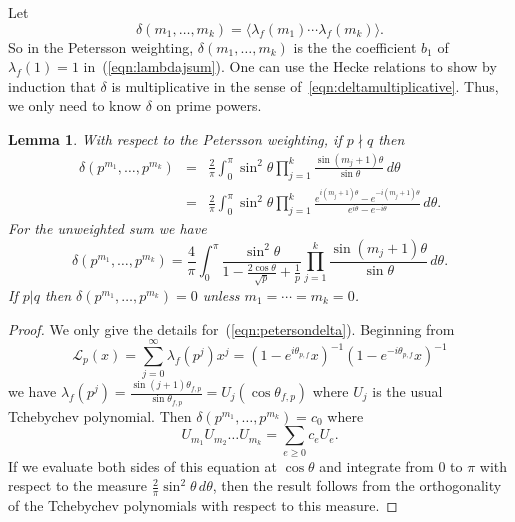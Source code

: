 \documentclass[12pt,letterpaper]{amsart}
\theoremstyle{plain}
\newtheorem{lemma}[theorem]{Lemma}
\theoremstyle{definition}
\theoremstyle{remark}
\numberwithin{equation}{subsection}
\numberwithin{theorem}{subsection}
\numberwithin{table}{subsection}
\begin{document}
Let
\begin{equation}\delta(m_1,\dots,m_k) = 
\langle \lambda_f(m_1)\cdots \lambda_f(m_k) \rangle.
\end{equation} 
So in the Petersson weighting, $\delta(m_1,\dots,m_k)$ is the 
the coefficient $b_1$ of $\lambda_f(1)=1$ in~(\ref{eqn:lambdajsum}).
One can use the Hecke relations to show by induction that $\delta$ is multiplicative
in the sense of~\ref{eqn:deltamultiplicative}. 
Thus, we only need to know $\delta$ on prime powers.

 \begin{lemma}\label{thm:chebyshevweights}
With respect to the Petersson weighting, if $p\nmid q$ then 
\begin{eqnarray}\label{eqn:petersondelta} 
\delta(p^{m_1},\dots,p^{m_k})
&  = &\frac{2}{\pi}\int_0^\pi
\sin^2\theta
\prod_{j=1}^k\frac{\sin(m_j+1)\theta}{\sin \theta}\,d\theta \nonumber \\&  = & \frac{2}{\pi}\int_0^\pi \sin^2\theta \prod_{j=1}^k
\frac{e^{i(m_j+1)\theta}-e^{-i(m_j+1)\theta}}{e^{i\theta}-e^{-i\theta}}
\,d\theta.
\end{eqnarray}
For the unweighted sum we have
\begin{equation}
\delta(p^{m_1},\dots,p^{m_k})
  = \frac{4}{\pi}\int_0^\pi
\frac{\sin^2\theta}{1-\frac{2\cos\theta}{\sqrt{p}} +\frac1p}
\prod_{j=1}^k\frac{\sin(m_j+1)\theta}{\sin \theta}\,d\theta .
\end{equation}
If $p|q$ then $\delta(p^{m_1},\dots,p^{m_k})=0$ unless $m_1=\cdots = m_k=0$.
\end{lemma}


\begin{proof} We only give the details for~(\ref{eqn:petersondelta}).
Beginning from 
\begin{equation}\mathcal{L}_p(x)=\sum_{j=0}^\infty
\lambda_f(p^j)x^j=\left(1-e^{i\theta_{p,f}}x\right)^{-1}
\left(1-e^{-i\theta_{p,f}}x\right)^{-1}
\end{equation}
we have
$\lambda_f(p^j)=\frac{\sin (j+1)\theta_{f,p}}{\sin
\theta_{f,p}}=U_j(\cos \theta_{f,p})$ where $U_j$ is the usual
Tchebychev polynomial. 
Then $\delta(p^{m_1},\dots, p^{m_k})=c_0$ where 
\begin{equation}
U_{m_1}U_{m_2}\dots U_{m_k}=\sum_{e\ge 0} c_e U_e.
\end{equation}
If we evaluate both sides of this equation at $\cos \theta$ and
integrate from 0 to $\pi$ with respect to the measure $\frac 2 \pi
\sin^2 \theta \,d\theta$, then the result follows from the
orthogonality of the Tchebychev polynomials with respect to this
measure.
\end{proof}
\end{document}
